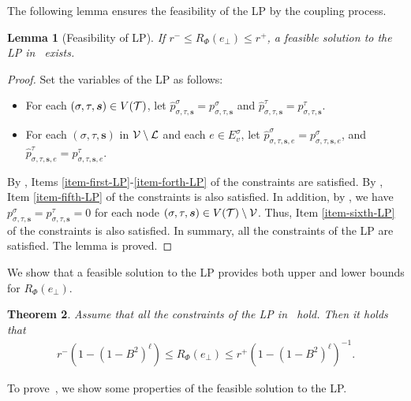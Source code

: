 \documentclass[11pt]{article}
\newtheorem{theorem}{Theorem}
\newtheorem{lemma}[theorem]{Lemma}
\newcommand{\seqS}{\boldsymbol{s}}
\newcommand{\hktodo}[1]{{\color{blue}{#1}}}
\begin{document}
The following lemma ensures the feasibility of the LP by the coupling process.

\begin{lemma}[Feasibility of LP] \label{lem:feasibility-of-LP}
    If $r^- \le R_\Phi(e_\bot) \le r^+$, a feasible solution to the LP in~ exists.
\end{lemma}
\begin{proof}
Set the variables of the LP as follows:
\begin{itemize}
    \item For each $(\sigma, \tau, \seqS) \in V(\+T)$, let $\widehat{p}_{\sigma, \tau, \seqS}^{\sigma} = p_{\sigma, \tau, \seqS}^{\sigma}$ and $\widehat{p}_{\sigma,\tau, \seqS}^{\tau} = p_{\sigma,\tau, \seqS}^{\tau}$.
    \item For each $(\sigma,\tau,\seqS)$ in $\mathcal{V}\setminus \mathcal{L}$ and each $e\in E_v^{\sigma}$, let  $\widehat{p}_{\sigma,\tau,\seqS,e}^{\sigma} = p_{\sigma,\tau,\seqS,e}^{\sigma}$, and $\widehat{p}_{\sigma,\tau,\seqS,e}^{\tau} = p_{\sigma,\tau,\seqS,e}^{\tau}$.
\end{itemize}
By , Items \ref{item-first-LP}-\ref{item-forth-LP} of the constraints are satisfied.
By , Item \ref{item-fifth-LP} of the constraints is also satisfied.
In addition, by , we have $ p^{\sigma}_{\sigma, \tau, \seqS}= p^{\tau}_{\sigma, \tau, \seqS} = 0$ for each node $(\sigma, \tau, \seqS)\in V(\+T)\setminus \+V$.
Thus, Item \ref{item-sixth-LP} of the constraints is also satisfied.
In summary, all the constraints of the LP are satisfied.
The lemma is proved.
\end{proof}


We show that a feasible solution to the LP provides both upper and lower bounds for $R_{\Phi}(e_\bot)$.

\hktodo{use $B$ not $B$ here}
\hktodo{change all $B$ to $B$}

\begin{theorem} \label{thm:ratio-bound-by-LP}
    Assume that all the constraints of the LP in~ hold. Then it holds that
    \begin{align*}
        r^{-} \left(1 - \left(1 - B^2\right)^{\ell}\right)\le R_{\Phi}(e_\bot) \le {r^+}\left(1 - \left(1 - B^2\right)^{\ell}\right)^{-1}.
    \end{align*}
\end{theorem}

To prove~, we show some properties of the feasible solution to the LP.
\end{document}
